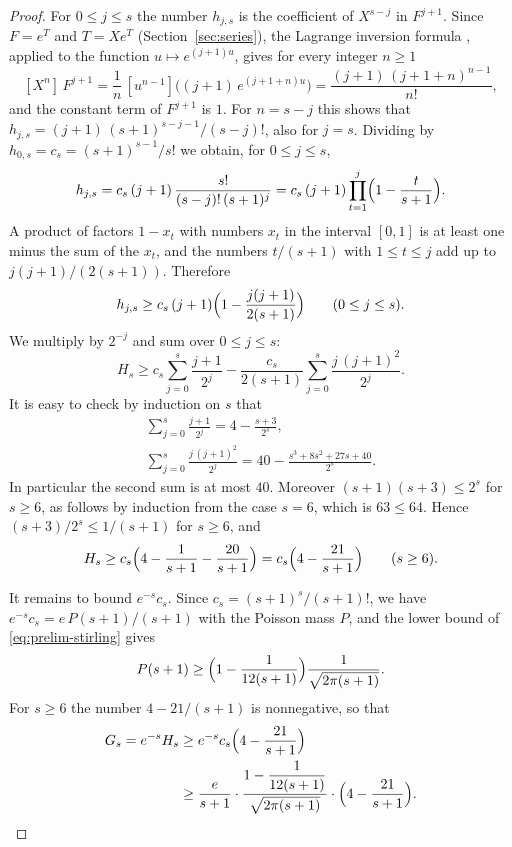 \documentclass{amsart}
\theoremstyle{definition}
\theoremstyle{remark}
\numberwithin{equation}{section}
\begin{document}
\begin{proof}
For $0\le j\le s$ the number $h_{j,s}$ is the coefficient of $X^{s-j}$ in
$F^{j+1}$. Since $F=e^{T}$ and $T=Xe^{T}$ (Section~\ref{sec:series}), the
Lagrange inversion formula \cite[Theorem~A.2]{flajoletsedgewick2009},
applied to the function $u\mapsto e^{(j+1)u}$, gives for every integer
$n\ge1$
\[
[X^n]\,F^{j+1}=\frac1n\,[u^{n-1}]\bigl((j+1)\,e^{(j+1+n)u}\bigr)
=\frac{(j+1)\,(j+1+n)^{n-1}}{n!} ,
\]
and the constant term of $F^{j+1}$ is $1$. For $n=s-j$ this shows that
$h_{j,s}=(j+1)\,(s+1)^{s-j-1}/(s-j)!$, also for $j=s$. Dividing by
$h_{0,s}=c_s=(s+1)^{s-1}/s!$ we obtain, for $0\le j\le s$,
\[
h_{j,s}=c_s\,(j+1)\,\frac{s!}{(s-j)!\,(s+1)^{j}}
=c_s\,(j+1)\prod_{t=1}^{j}\Bigl(1-\frac{t}{s+1}\Bigr).
\]
A product of factors $1-x_t$ with numbers $x_t$ in the interval $[0,1]$ is
at least one minus the sum of the $x_t$, and the numbers $t/(s+1)$ with
$1\le t\le j$ add up to $j(j+1)/(2(s+1))$. Therefore
\[
h_{j,s}\ge c_s\,(j+1)\Bigl(1-\frac{j(j+1)}{2(s+1)}\Bigr)
\qquad(0\le j\le s).
\]
We multiply by $2^{-j}$ and sum over $0\le j\le s$:
\[
H_s\ge c_s\sum_{j=0}^{s}\frac{j+1}{2^{j}}
-\frac{c_s}{2(s+1)}\sum_{j=0}^{s}\frac{j\,(j+1)^2}{2^{j}} .
\]
It is easy to check by induction on $s$ that
\begin{gather*}
\sum_{j=0}^{s}\frac{j+1}{2^{j}}=4-\frac{s+3}{2^{s}},\\
\sum_{j=0}^{s}\frac{j\,(j+1)^2}{2^{j}}
=40-\frac{s^3+8s^2+27s+40}{2^{s}} .
\end{gather*}
In particular the second sum is at most $40$. Moreover
$(s+1)(s+3)\le2^{s}$ for $s\ge6$, as follows by induction from the case
$s=6$, which is $63\le64$. Hence $(s+3)/2^{s}\le1/(s+1)$ for $s\ge6$, and
\[
H_s\ge c_s\Bigl(4-\frac{1}{s+1}-\frac{20}{s+1}\Bigr)
=c_s\Bigl(4-\frac{21}{s+1}\Bigr)\qquad(s\ge6).
\]

It remains to bound $e^{-s}c_s$. Since $c_s=(s+1)^{s}/(s+1)!$, we have
$e^{-s}c_s=e\,P(s+1)/(s+1)$ with the Poisson mass $P$, and
the lower bound of \eqref{eq:prelim-stirling} gives
\[
P(s+1)\ge \Bigl(1-\frac{1}{12(s+1)}\Bigr)\frac{1}{\sqrt{2\pi(s+1)}} .
\]
For $s\ge6$ the number $4-21/(s+1)$ is nonnegative, so that
\begin{align*}
G_s=e^{-s}H_s&\ge e^{-s}c_s\Bigl(4-\frac{21}{s+1}\Bigr)\\
&\ge \frac{e}{s+1}\cdot
\frac{1-\dfrac{1}{12(s+1)}}{\sqrt{2\pi(s+1)}}\cdot
\Bigl(4-\frac{21}{s+1}\Bigr).\qedhere
\end{align*}
\end{proof}
\end{document}
